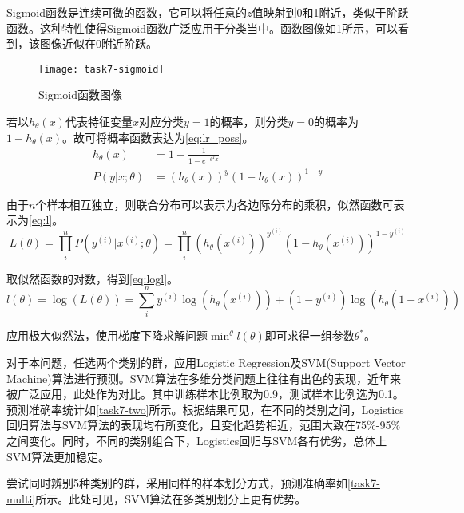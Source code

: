 \documentclass[a4paper,12pt]{article}
\begin{document}
    Sigmoid函数是连续可微的函数，它可以将任意的$z$值映射到0和1附近，类似于阶跃函数。这种特性使得Sigmoid函数广泛应用于分类当中。函数图像如\cref{fig:sigmoid}所示，可以看到，该图像近似在0附近阶跃。
    \begin{figure}
      \centering
      \texttt{[image: task7-sigmoid]}
      \caption{Sigmoid函数图像}
      \label{fig:sigmoid}
    \end{figure}

    若以$h_\theta(x)$代表特征变量$x$对应分类$y=1$的概率，则分类$y=0$的概率为$1-h_\theta(x)$。故可将概率函数表达为\cref{eq:lr_poss}。
    \begin{equation}
      \label{eq:lr_poss}
      \begin{aligned}
        h_\theta(x) &= 1-\frac{1}{1-e^{-\theta^T x}} \\
        P(y|x;\theta) &= (h_\theta(x))^y (1-h_\theta(x))^{1-y}
      \end{aligned}
    \end{equation}

    由于$n$个样本相互独立，则联合分布可以表示为各边际分布的乘积，似然函数可表示为\cref{eq:l}。
    \begin{equation}
      \label{eq:l}
      L(\theta) = \prod_{i}^n {P(y^{(i)}|x^{(i)};\theta)} = \prod_{i}^n {(h_\theta(x^{(i)}))^{y^{(i)}} (1-h_\theta(x^{(i)}))^{1-y^{(i)}}}
    \end{equation}

    取似然函数的对数，得到\cref{eq:logl}。
    \begin{equation}
      \label{eq:logl}
      l(\theta) = \log(L(\theta)) = \sum_{i}^n {y^{(i)} \log(h_\theta(x^{(i)})) + (1 - y^{(i)}) \log(h_\theta(1-x^{(i)}))}
    \end{equation}

    应用极大似然法，使用梯度下降求解问题$\min^{\theta} l(\theta)$即可求得一组参数$\theta^*$。

    对于本问题，任选两个类别的群，应用Logistic Regression及SVM(Support Vector Machine)算法进行预测。SVM算法在多维分类问题上往往有出色的表现，近年来被广泛应用，此处作为对比。其中训练样本比例取为0.9，测试样本比例选为0.1。预测准确率统计如\cref{task7-two}所示。根据结果可见，在不同的类别之间，Logistics回归算法与SVM算法的表现均有所变化，且变化趋势相近，范围大致在75\%-95\%之间变化。同时，不同的类别组合下，Logistics回归与SVM各有优劣，总体上SVM算法更加稳定。
    

    尝试同时辨别5种类别的群，采用同样的样本划分方式，预测准确率如\cref{task7-multi}所示。此处可见，SVM算法在多类别划分上更有优势。
    
    \label{applastpage}
    \newpage
    
    
\iffalse
\begin{itemize}[noitemsep,topsep=0pt]
\end{itemize}
\begin{enumerate}[label=\Roman{*}.,noitemsep,topsep=0pt]
\end{enumerate}
\begin{multicols}{2}
\end{multicols}
\fi
\end{document}
